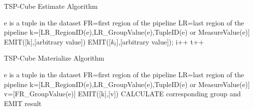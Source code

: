 


{\renewcommand\baselinestretch{1} 
\begin{algorithm}[ht]
\caption{TSP-Cube Estimate Algorithm}
\label{tscube_mr1}
{\fontfamily{\familydefault}\selectfont

	\begin{algorithmic}[1] %
    	\State e is a tuple in the dataset
    		\State FR=first region of the pipeline
    		\State LR=last region of the pipeline
        	\State k=[LR\_RegionID(e),LR\_GroupValue(e),TupleID(e) or MeasureValue(e)]
        	\State EMIT([k],[arbitrary value])
        \EndFor
   	 \EndFunction
   	 \State
     		 \State	
     		 EMIT([${k}_{t}$],[arbitrary value]); i++
     		\EndIf
     		\State t++
     	\EndWhile
     \EndFunction
	\end{algorithmic}	
}
\end{algorithm}



\begin{algorithm}[ht]
\caption{TSP-Cube Materialize Algorithm}
\label{tscube_mr2}
{\fontfamily{\familydefault}\selectfont

	\begin{algorithmic}[1] %
    	\State e is a tuple in the dataset
    		\State FR=first region of the pipeline
    		\State LR=last region of the pipeline
        	\State k=[LR\_RegionID(e),LR\_GroupValue(e),TupleID(e) or MeasureValue(e)]
        	\State v=[FR\_GroupValue(e)]
        	\State EMIT([k],[v])
        \EndFor
   	 \EndFunction
   	 \State
     			\State
     			CALCULATE corresponding group and EMIT result
     		\EndIf
     	\EndFor
     \EndFunction
	\end{algorithmic}	
}
\end{algorithm}



}
